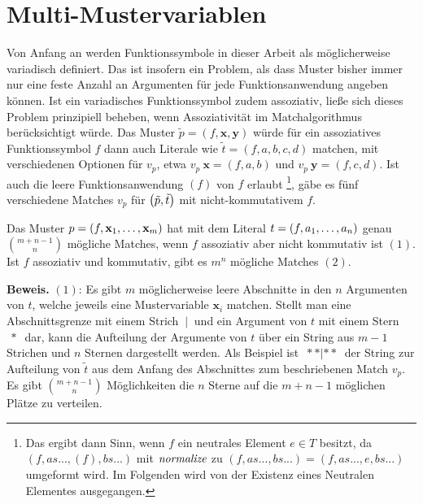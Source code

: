 \section{Multi-Mustervariablen} \label{subsecMulti}

Von Anfang an werden Funktionssymbole in dieser Arbeit als möglicherweise variadisch definiert. Das ist insofern ein Problem, als dass Muster bisher immer nur eine feste Anzahl an Argumenten für jede Funktionsanwendung angeben können. Ist ein variadisches Funktionssymbol zudem assoziativ, ließe sich dieses Problem prinzipiell beheben, wenn Assoziativität im Matchalgorithmus berücksichtigt würde. Das Muster $\tilde p = (f, \mathbf x, \mathbf y)$ würde für ein assoziatives Funktionssymbol $f$ dann auch Literale wie $\tilde t = (f, a, b, c, d)$ matchen, mit verschiedenen Optionen für $v_p$, etwa $v_p~\mathbf x = (f, a, b)$ und $v_p~\mathbf y = (f, c, d)$. Ist auch die leere Funktionsanwendung $(f)$ von $f$ erlaubt \footnote{Das ergibt dann Sinn, wenn $f$ ein neutrales Element $e \in T$ besitzt, da $(f, as..., (f), bs...)$ mit $\Const{normalize}$ zu $(f, as..., bs...) = (f, as..., e, bs...)$ umgeformt wird. Im Folgenden wird von der Existenz eines Neutralen Elementes ausgegangen.}, gäbe es fünf verschiedene Matches $v_p$ für $\paren*{\tilde p, \tilde t}$ mit nicht-kommutativem $f$.

\begin{lemma} \label{lemNrAssocMatches}
Das Muster $p = (f, \elems {\mathbf x} 1 m)$ hat mit dem Literal $t = (f, \elems a 1 n)$ genau ${m + n - 1}\choose n$ mögliche Matches, wenn $f$ assoziativ aber nicht kommutativ ist $(1)$. Ist $f$ assoziativ und kommutativ, gibt es $m^n$ mögliche Matches $(2)$.\\
\end{lemma}

\textbf{Beweis.}
$(1)$: Es gibt $m$ möglicherweise leere Abschnitte in den $n$ Argumenten von $t$, welche jeweils eine Mustervariable $\mathbf x_i$ matchen. Stellt man eine Abschnittsgrenze mit einem Strich $~|~$ und ein Argument von $t$ mit einem Stern $~*~$ dar, kann die Aufteilung der Argumente von $t$ über ein String aus $m - 1$ Strichen und $n$ Sternen dargestellt werden. 
Als Beispiel ist $~**|**~$ der String zur Aufteilung von $\tilde t$ aus dem Anfang des Abschnittes zum beschriebenen Match $v_p$.
Es gibt ${m + n - 1}\choose n$ Möglichkeiten die $n$ Sterne auf die ${m + n - 1}$ möglichen Plätze zu verteilen.\\

